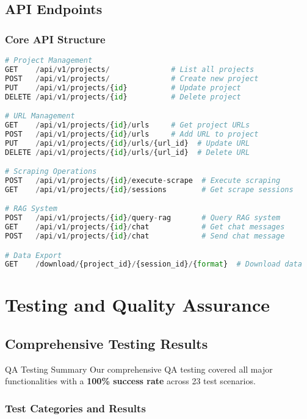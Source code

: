 \documentclass[12pt,a4paper]{report}
\begin{document}
\section{API Endpoints}

\subsection{Core API Structure}

\begin{lstlisting}[language=Python, caption=API Endpoint Examples]
# Project Management
GET    /api/v1/projects/              # List all projects
POST   /api/v1/projects/              # Create new project
PUT    /api/v1/projects/{id}          # Update project
DELETE /api/v1/projects/{id}          # Delete project

# URL Management
GET    /api/v1/projects/{id}/urls     # Get project URLs
POST   /api/v1/projects/{id}/urls     # Add URL to project
PUT    /api/v1/projects/{id}/urls/{url_id}  # Update URL
DELETE /api/v1/projects/{id}/urls/{url_id}  # Delete URL

# Scraping Operations
POST   /api/v1/projects/{id}/execute-scrape  # Execute scraping
GET    /api/v1/projects/{id}/sessions        # Get scrape sessions

# RAG System
POST   /api/v1/projects/{id}/query-rag       # Query RAG system
GET    /api/v1/projects/{id}/chat            # Get chat messages
POST   /api/v1/projects/{id}/chat            # Send chat message

# Data Export
GET    /download/{project_id}/{session_id}/{format}  # Download data
\end{lstlisting}

\chapter{Testing and Quality Assurance}

\section{Comprehensive Testing Results}

\begin{infobox}{QA Testing Summary}
Our comprehensive QA testing covered all major functionalities with a \textbf{100\% success rate} across 23 test scenarios.
\end{infobox}

\subsection{Test Categories and Results}
\end{document}
